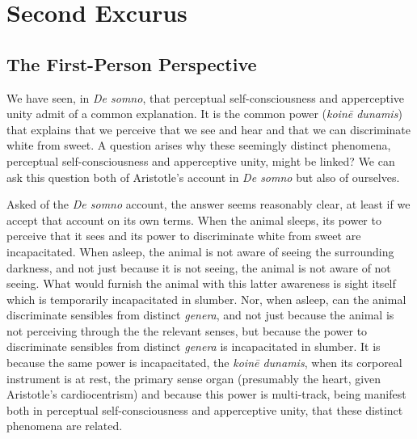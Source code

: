 \chapter{Second Excurus} %
\label{cha:second_excurus}




\section{The First-Person Perspective} %
\label{sec:first-person_perspective_and_the_phenomenal}

We have seen, in \emph{De somno}, that perceptual self-consciousness and apperceptive unity admit of a common explanation. It is the common power (\emph{koinē dunamis}) that explains that we perceive that we see and hear and that we can discriminate white from sweet. A question arises why these seemingly distinct phenomena, perceptual self-consciousness and apperceptive unity, might be linked? We can ask this question both of Aristotle's account in \emph{De somno} but also of ourselves.

Asked of the \emph{De somno} account, the answer seems reasonably clear, at least if we accept that account on its own terms. When the animal sleeps, its power to perceive that it sees and its power to discriminate white from sweet are incapacitated. When asleep, the animal is not aware of seeing the surrounding darkness, and not just because it is not seeing, the animal is not aware of not seeing. What would furnish the animal with this latter awareness is sight itself which is temporarily incapacitated in slumber. Nor, when asleep, can the animal discriminate sensibles from distinct \emph{genera}, and not just because the animal is not perceiving through the the relevant senses, but because the power to discriminate sensibles from distinct \emph{genera} is incapacitated in slumber. It is because the same power is incapacitated, the \emph{koinē dunamis}, when its corporeal instrument is at rest, the primary sense organ (presumably the heart, given Aristotle's cardiocentrism) and because this power is multi-track, being manifest both in perceptual self-consciousness and apperceptive unity, that these distinct phenomena are related.

